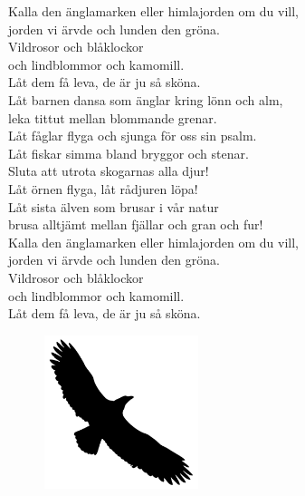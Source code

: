 \documentclass[a6paper, 10pt, twoside]{article}
\begin{document}

\noindent
\begin{center}
\end{center}
\begin{lyrics}
Kalla den änglamarken eller himlajorden om du vill,\\
jorden vi ärvde och lunden den gröna.\\
Vildrosor och blåklockor \\
och lindblommor och kamomill.\\
Låt dem få leva, de är ju så sköna.
\vspace{5pt}\\
Låt barnen dansa som änglar kring lönn och alm,\\
leka tittut mellan blommande grenar.\\
Låt fåglar flyga och sjunga för oss sin psalm.\\
Låt fiskar simma bland bryggor och stenar.
\vspace{5pt}\\
Sluta att utrota skogarnas alla djur!\\
Låt örnen flyga, låt rådjuren löpa!\\
Låt sista älven som brusar i vår natur\\
brusa alltjämt mellan fjällar och gran och fur!
\vspace{5pt}\\
Kalla den änglamarken eller himlajorden om du vill,\\
jorden vi ärvde och lunden den gröna.\\
Vildrosor och blåklockor \\
och lindblommor och kamomill.\\
Låt dem få leva, de är ju så sköna.
\end{lyrics}
\begin{figure}[!h]
\centering
\includegraphics[width=0.4\textwidth]{eagle.png}
\end{figure}
\end{document}
